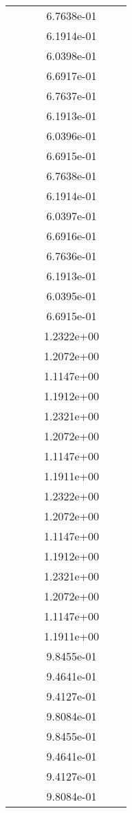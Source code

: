 \begin{xltabular}{\textwidth}{r|rS[table-format=1.3e+2]S[table-format=1.4e+2]S[table-format=1.4e+2]S[table-format=-1.5]}
&  &  & 6.7638e-01 & & \\
&  &  & 6.1914e-01 & & \\
&  &  & 6.0398e-01 & & \\
&  &  & 6.6917e-01 & & \\
&  &  & 6.7637e-01 & & \\
&  &  & 6.1913e-01 & & \\
&  &  & 6.0396e-01 & & \\
&  &  & 6.6915e-01 & & \\
&  &  & 6.7638e-01 & & \\
&  &  & 6.1914e-01 & & \\
&  &  & 6.0397e-01 & & \\
&  &  & 6.6916e-01 & & \\
&  &  & 6.7636e-01 & & \\
&  &  & 6.1913e-01 & & \\
&  &  & 6.0395e-01 & & \\
&  &  & 6.6915e-01 & & \\
&  &  & 1.2322e+00 & & \\
&  &  & 1.2072e+00 & & \\
&  &  & 1.1147e+00 & & \\
&  &  & 1.1912e+00 & & \\
&  &  & 1.2321e+00 & & \\
&  &  & 1.2072e+00 & & \\
&  &  & 1.1147e+00 & & \\
&  &  & 1.1911e+00 & & \\
&  &  & 1.2322e+00 & & \\
&  &  & 1.2072e+00 & & \\
&  &  & 1.1147e+00 & & \\
&  &  & 1.1912e+00 & & \\
&  &  & 1.2321e+00 & & \\
&  &  & 1.2072e+00 & & \\
&  &  & 1.1147e+00 & & \\
&  &  & 1.1911e+00 & & \\
&  &  & 9.8455e-01 & & \\
&  &  & 9.4641e-01 & & \\
&  &  & 9.4127e-01 & & \\
&  &  & 9.8084e-01 & & \\
&  &  & 9.8455e-01 & & \\
&  &  & 9.4641e-01 & & \\
&  &  & 9.4127e-01 & & \\
&  &  & 9.8084e-01 & & \\

\end{xltabular}
